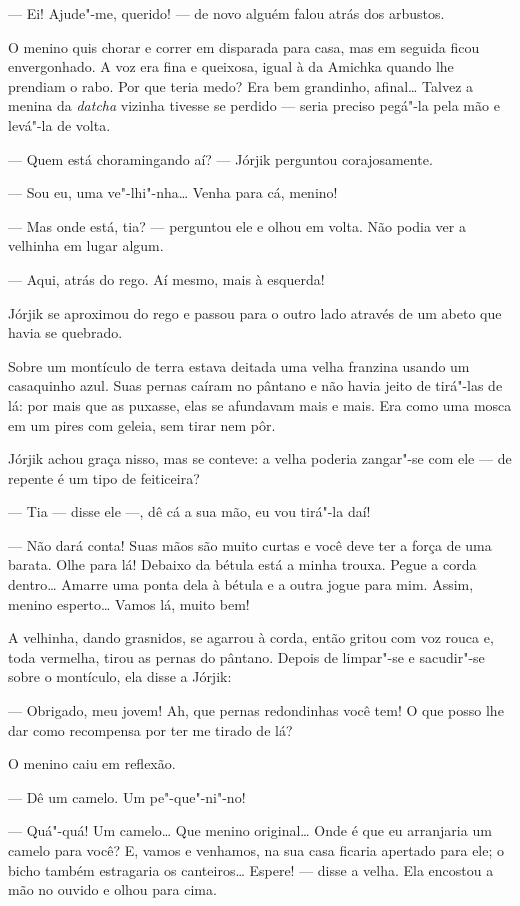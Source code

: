 --- Ei! Ajude"-me, querido! --- de novo alguém falou atrás dos arbustos.

O menino quis chorar e correr em disparada para casa, mas em seguida ficou
envergonhado. A voz era fina e queixosa, igual à da Amichka quando lhe
prendiam o rabo. Por que teria medo? Era bem grandinho, afinal\ldots{} Talvez
a menina da \emph{datcha} vizinha tivesse se perdido --- seria preciso
pegá"-la pela mão e levá"-la de volta.

--- Quem está choramingando aí? --- Jórjik perguntou corajosamente.

--- Sou eu, uma ve"-lhi"-nha\ldots{} Venha para cá, menino!

--- Mas onde está, tia? --- perguntou ele e olhou em volta. Não podia
ver a velhinha em lugar algum.

--- Aqui, atrás do rego. Aí mesmo, mais à esquerda!

Jórjik se aproximou do rego e passou para o outro lado através de um
abeto que havia se quebrado.

Sobre um montículo de terra estava deitada uma velha franzina usando um
casaquinho azul. Suas pernas caíram no pântano e não havia jeito de
tirá"-las de lá: por mais que as puxasse, elas se afundavam mais e mais.
Era como uma mosca em um pires com geleia, sem tirar nem pôr.

Jórjik achou graça nisso, mas se conteve: a velha poderia zangar"-se com
ele --- de repente é um tipo de feiticeira?

--- Tia --- disse ele ---, dê cá a sua mão, eu vou tirá"-la daí!

--- Não dará conta! Suas mãos são muito curtas e você deve ter a força
de uma barata. Olhe para lá! Debaixo da bétula está a minha trouxa.
Pegue a corda dentro\ldots{} Amarre uma ponta dela à bétula e a outra jogue
para mim. Assim, menino esperto\ldots{} Vamos lá, muito bem!

A velhinha, dando grasnidos, se agarrou à corda, então gritou com voz
rouca e, toda vermelha, tirou as pernas do pântano. Depois de limpar"-se
e sacudir"-se sobre o montículo, ela disse a Jórjik:

--- Obrigado, meu jovem! Ah, que pernas redondinhas você tem! O que
posso lhe dar como recompensa por ter me tirado de lá?

O menino caiu em reflexão.

--- Dê um camelo. Um pe"-que"-ni"-no!

--- Quá"-quá! Um camelo\ldots{} Que menino original\ldots{} Onde é que eu
arranjaria um camelo para você? E, vamos e venhamos, na sua casa ficaria
apertado para ele; o bicho também estragaria os canteiros\ldots{} Espere! ---
disse a velha. Ela encostou a mão no ouvido e olhou para cima.

